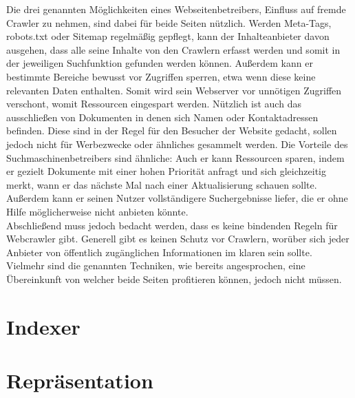 Die drei genannten Möglichkeiten eines Webseitenbetreibers, Einfluss auf fremde Crawler zu nehmen, sind dabei für beide Seiten nützlich. Werden Meta-Tags, robots.txt oder Sitemap regelmäßig gepflegt, kann der Inhalteanbieter davon ausgehen, dass alle seine Inhalte von den Crawlern erfasst werden und somit in der jeweiligen Suchfunktion gefunden werden können. Außerdem kann er bestimmte Bereiche bewusst vor Zugriffen sperren, etwa wenn diese keine relevanten Daten enthalten. Somit wird sein Webserver vor unnötigen Zugriffen verschont, womit Ressourcen eingespart werden. Nützlich ist auch das ausschließen von Dokumenten in denen sich Namen oder Kontaktadressen befinden. Diese sind in der Regel für den Besucher der Website gedacht, sollen jedoch nicht für Werbezwecke oder ähnliches gesammelt werden. Die Vorteile des Suchmaschinenbetreibers sind ähnliche: Auch er kann Ressourcen sparen, indem er gezielt Dokumente mit einer hohen Priorität anfragt und sich gleichzeitig merkt, wann er das nächste Mal nach einer Aktualisierung schauen sollte. Außerdem kann er seinen Nutzer vollständigere Suchergebnisse liefer, die er ohne Hilfe möglicherweise nicht anbieten könnte.\\
Abschließend muss jedoch bedacht werden, dass es keine bindenden Regeln für Webcrawler gibt. Generell gibt es keinen Schutz vor Crawlern, worüber sich jeder Anbieter von öffentlich zugänglichen Informationen im klaren sein sollte. Vielmehr sind die genannten Techniken, wie bereits angesprochen, eine Übereinkunft von welcher beide Seiten profitieren können, jedoch nicht müssen.

\section{Indexer}

\section{Repräsentation}